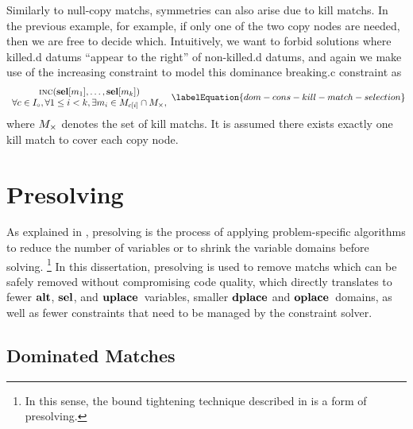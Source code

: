 Similarly to \glspl{null-copy match}, symmetries can also arise due to
\glspl{kill match}.
%
In the previous example, for example, if only one of the two \glspl{copy node}
are needed, then we are free to decide which.
%
Intuitively, we want to forbid \glspl{solution} where \gls{killed.d}
\glspl{datum} ``appear to the right'' of non-\gls{killed.d} \glspl{datum}, and
again we make use of the \gls{increasing constraint} to model this
\gls{dominance breaking.c} \gls{constraint} as
%
\begin{equation}
  \begin{array}{c}
    \mIncreasing(\mVar{sel}[m_1], \ldots, \mVar{sel}[m_k]) \\
    \forall c \in \mInterchDataSet[\mCopy],
    \forall 1 \leq i < k,
    \exists m_i \in \mMatchSet[c[i]] \cap \mKillMatchSet,
  \end{array}
  \labelEquation{dom-cons-kill-match-selection}
\end{equation}
%
where $\mKillMatchSet$ denotes the set of \glspl{kill match}.
%
It is assumed there exists exactly one \gls{kill match} to cover each \gls{copy
  node}.


\section{Presolving}

As explained in , \gls{presolving} is the
process of applying problem-specific algorithms to reduce the number of
\glspl{variable} or to shrink the \gls{variable} \glspl{domain} before
solving.\!%
%
\footnote{%
  In this sense, the bound tightening technique described in
   is a form of \gls{presolving}.%
}
%
In this dissertation, \gls{presolving} is used to remove \glspl{match} which can
be safely removed without compromising code quality, which directly translates
to fewer $\mVar{alt}$, $\mVar{sel}$, and $\mVar{uplace}$~\glspl{variable},
smaller $\mVar{dplace}$ and $\mVar{oplace}$~\glspl{domain}, as well as fewer
\glspl{constraint} that need to be managed by the \gls{constraint solver}.


\subsection{Dominated Matches}

